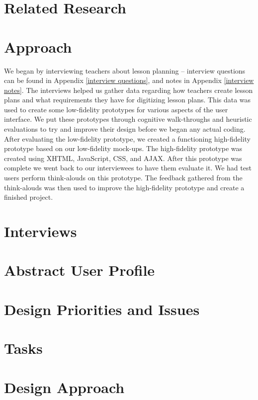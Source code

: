\documentclass[10pt,letter]{article}
\begin{document}
\section{Related Research}

\section{Approach}
We began by interviewing teachers about lesson planning -- interview questions
can be found in Appendix \ref{interview questions}, and notes in Appendix
\ref{interview notes}. The interviews helped us gather data regarding how
teachers create lesson plans and what requirements they have for digitizing
lesson plans. This data was used to create some low-fidelity prototypes for
various aspects of the user interface. We put these prototypes through cognitive
walk-throughs and heuristic evaluations to try and improve their design before
we began any actual coding. After evaluating the low-fidelity prototype, we
created a functioning high-fidelity prototype based on our low-fidelity
mock-ups. The high-fidelity prototype was created using XHTML, JavaScript, CSS,
and AJAX. After this prototype was complete we went back to our interviewees to
have them evaluate it. We had test users perform think-alouds on this prototype.
The feedback gathered from the think-alouds was then used to improve the
high-fidelity prototype and create a finished project.

\section{Interviews}

\section{Abstract User Profile}

\section{Design Priorities and Issues}

\section{Tasks}

\section{Design Approach}
\end{document}
